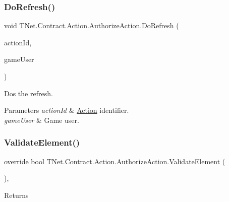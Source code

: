 \subsubsection{\texorpdfstring{Do\+Refresh()}{DoRefresh()}}
{\footnotesize\ttfamily void T\+Net.\+Contract.\+Action.\+Authorize\+Action.\+Do\+Refresh (\begin{DoxyParamCaption}\item[{int}]{action\+Id,  }\item[{\mbox{\hyperlink{interface_t_net_1_1_context___1_1_i_user}{I\+User}}}]{game\+User }\end{DoxyParamCaption})\hspace{0.3cm}{\ttfamily [protected]}}



Dos the refresh. 


\begin{DoxyParams}{Parameters}
{\em action\+Id} & \mbox{\hyperlink{namespace_t_net_1_1_contract_1_1_action}{Action}} identifier.\\
\hline
{\em game\+User} & Game user.\\
\hline
\end{DoxyParams}
\mbox{\label{class_t_net_1_1_contract_1_1_action_1_1_authorize_action_a71b0f279c0f6f2d32d371388a2fa0947}} 
\subsubsection{\texorpdfstring{Validate\+Element()}{ValidateElement()}}
{\footnotesize\ttfamily override bool T\+Net.\+Contract.\+Action.\+Authorize\+Action.\+Validate\+Element (\begin{DoxyParamCaption}{ }\end{DoxyParamCaption})\hspace{0.3cm}{\ttfamily [protected]}, {\ttfamily [virtual]}}





\begin{DoxyReturn}{Returns}

\end{DoxyReturn}


